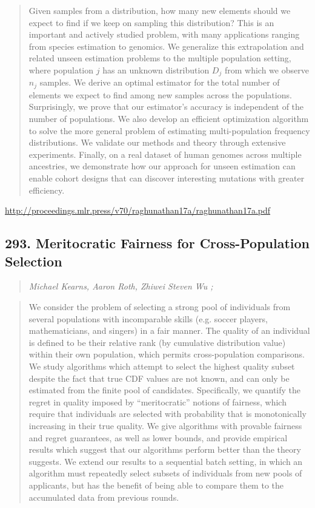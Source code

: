 \documentclass{article}
\begin{document}
\begin{quote}
    Given samples from a distribution, how many new elements should we expect to find if we keep on sampling this distribution? This is an important and actively studied problem, with many applications ranging from species estimation to genomics. We generalize this extrapolation and related unseen estimation problems to the multiple population setting, where population $j$ has an unknown distribution $D_j$ from which we observe $n_j$ samples. We derive an optimal estimator for the total number of elements we expect to find among new samples across the populations. Surprisingly, we prove that our estimator’s accuracy is independent of the number of populations. We also develop an efficient optimization algorithm to solve the more general problem of estimating multi-population frequency distributions. We validate our methods and theory through extensive experiments. Finally, on a real dataset of human genomes across multiple ancestries, we demonstrate how our approach for unseen estimation can enable cohort designs that can discover interesting mutations with greater efficiency.  \end{quote}

\href{http://proceedings.mlr.press/v70/raghunathan17a/raghunathan17a.pdf}{http://proceedings.mlr.press/v70/raghunathan17a/raghunathan17a.pdf}

\subsection{293. Meritocratic Fairness for Cross-Population Selection}

\begin{quote}
\footnotesize{\textit{Michael Kearns, Aaron Roth, Zhiwei Steven Wu ;}}
\end{quote}

\begin{quote}
    We consider the problem of selecting a strong pool of individuals from several populations with incomparable skills (e.g. soccer players, mathematicians, and singers) in a fair manner. The quality of an individual is defined to be their relative rank (by cumulative distribution value) within their own population, which permits cross-population comparisons. We study algorithms which attempt to select the highest quality subset despite the fact that true CDF values are not known, and can only be estimated from the finite pool of candidates. Specifically, we quantify the regret in quality imposed by “meritocratic” notions of fairness, which require that individuals are selected with probability that is monotonically increasing in their true quality. We give algorithms with provable fairness and regret guarantees, as well as lower bounds, and provide empirical results which suggest that our algorithms perform better than the theory suggests. We extend our results to a sequential batch setting, in which an algorithm must repeatedly select subsets of individuals from new pools of applicants, but has the benefit of being able to compare them to the accumulated data from previous rounds.  \end{quote}
\end{document}
